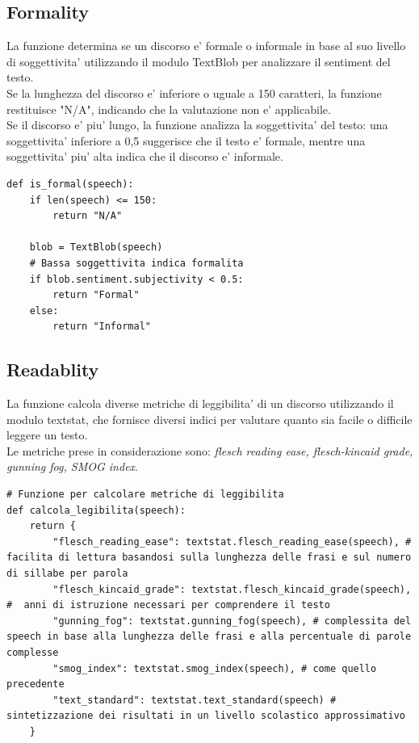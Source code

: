 \documentclass{article}
\begin{document}
		\subsection{Formality}
La funzione determina se un discorso e' formale o informale in base al suo livello di soggettivita' utilizzando il modulo TextBlob per analizzare il sentiment del testo. \\Se la lunghezza del discorso e' inferiore o uguale a 150 caratteri, la funzione restituisce "N/A", indicando che la valutazione non e' applicabile.\\
Se il discorso e' piu' lungo, la funzione analizza la soggettivita' del testo: una soggettivita' inferiore a 0,5 suggerisce che il testo e' formale, mentre una soggettivita' piu' alta indica che il discorso e' informale.	
	\begin{lstlisting}
def is_formal(speech):
	if len(speech) <= 150:
		return "N/A"
	
	blob = TextBlob(speech)
	# Bassa soggettivita indica formalita
	if blob.sentiment.subjectivity < 0.5:
		return "Formal"
	else:
		return "Informal"
	\end{lstlisting}
	
		\subsection{Readablity}
La funzione calcola diverse metriche di leggibilita' di un discorso utilizzando il modulo textstat, che fornisce diversi indici per valutare quanto sia facile o difficile leggere un testo. \\Le metriche prese in considerazione sono: \textit{flesch reading ease, flesch-kincaid grade, gunning fog, SMOG index}.
	\begin{lstlisting}
# Funzione per calcolare metriche di leggibilita
def calcola_legibilita(speech):
	return {
		"flesch_reading_ease": textstat.flesch_reading_ease(speech), # facilita di lettura basandosi sulla lunghezza delle frasi e sul numero di sillabe per parola
		"flesch_kincaid_grade": textstat.flesch_kincaid_grade(speech), #  anni di istruzione necessari per comprendere il testo
		"gunning_fog": textstat.gunning_fog(speech), # complessita del speech in base alla lunghezza delle frasi e alla percentuale di parole complesse
		"smog_index": textstat.smog_index(speech), # come quello precedente
		"text_standard": textstat.text_standard(speech) # sintetizzazione dei risultati in un livello scolastico approssimativo
	}
	\end{lstlisting}
	
\end{document}
